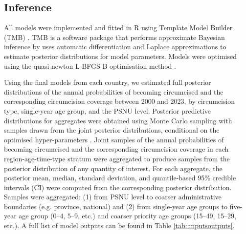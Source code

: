 \documentclass{article}
\begin{document}
\begin{appendix}


\subsection{Inference}
\label{sec::inference}


All models were implemented and fitted in R \cite{rcore} using Template Model Builder (TMB) \cite{kristensen2016tmb}. TMB is a software package that performs approximate Bayesian inference by uses automatic differentiation and Laplace approximations to estimate posterior distributions for model parameters. Models were optimised using the quasi-newton L-BFGS-B optimisation method \cite{byrd1995limited}.

Using the final models from each country, we estimated full posterior distributions of the annual probabilities of becoming circumcised and the corresponding circumcision coverage between 2000 and 2023, by circumcision type, single-year age group, and the PSNU level. Posterior predictive distributions for aggregates were obtained using Monte Carlo sampling with samples drawn from the joint posterior distributions, conditional on the optimised hyper-parameters \cite{eaton2021naomi}. Joint samples of the annual probabilities of becoming circumcised and the corresponding circumcision coverage in each region-age-time-type stratum were aggregated to produce samples from the posterior distribution of any quantity of interest. For each aggregate, the posterior mean, median, standard deviation, and quantile-based 95\% credible intervals (CI) were computed from the corresponding posterior distribution. Samples were aggregated: (1) from PSNU level to coarser administrative boundaries (e.g. province, national) and (2) from single-year age groups to five-year age group (0--4, 5--9, etc.) and coarser priority age groups (15--49, 15--29, etc.). A full list of model outputs can be found in Table \ref{tab::inputsoutputs}.


\end{appendix}
\end{document}
